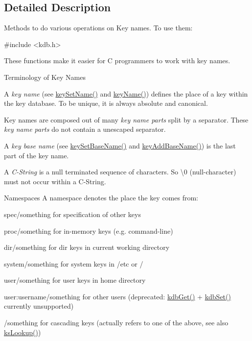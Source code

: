 \subsection{Detailed Description}
Methods to do various operations on Key names. To use them\-: 
\begin{DoxyCode}
\textcolor{preprocessor}{#include <kdb.h>}
\end{DoxyCode}


These functions make it easier for C programmers to work with key names.

\begin{DoxyParagraph}{Terminology of Key Names}

\begin{DoxyItemize}
\item A {\itshape key name} (see \hyperlink{group__keyname_ga7699091610e7f3f43d2949514a4b35d9}{key\-Set\-Name()} and \hyperlink{group__keyname_ga8e805c726a60da921d3736cda7813513}{key\-Name()}) defines the place of a key within the key database. To be unique, it is always absolute and canonical.
\item Key names are composed out of many {\itshape key name parts} split by a separator. These {\itshape key name parts} do not contain a unescaped separator.
\item A {\itshape key base name} (see \hyperlink{group__keyname_ga6e804bd453f98c28b0ff51430d1df407}{key\-Set\-Base\-Name()} and \hyperlink{group__keyname_gaa942091fc4bd5c2699e49ddc50829524}{key\-Add\-Base\-Name()}) is the last part of the key name.
\item A {\itshape C-\/\-String} is a null terminated sequence of characters. So \textbackslash{}0 (null-\/character) must not occur within a C-\/\-String.
\end{DoxyItemize}
\end{DoxyParagraph}
\begin{DoxyParagraph}{Namespaces}
A namespace denotes the place the key comes from\-: 
\begin{DoxyItemize}
\item {\ttfamily spec/something} for specification of other keys
\item {\ttfamily proc/something} for in-\/memory keys (e.\-g. command-\/line)
\item {\ttfamily dir/something} for dir keys in current working directory
\item {\ttfamily system/something} for system keys in /etc or /
\item {\ttfamily user/something} for user keys in home directory
\item {\ttfamily user\-:username/something} for other users (deprecated\-: \hyperlink{group__kdb_ga28e385fd9cb7ccfe0b2f1ed2f62453a1}{kdb\-Get()} + \hyperlink{group__kdb_ga11436b058408f83d303ca5e996832bcf}{kdb\-Set()} currently unsupported)
\item {\ttfamily /something} for cascading keys (actually refers to one of the above, see also \hyperlink{group__keyset_gaa34fc43a081e6b01e4120daa6c112004}{ks\-Lookup()}) 
\end{DoxyItemize}
\end{DoxyParagraph}
